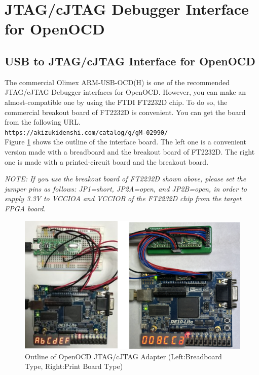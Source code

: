 \section{JTAG/cJTAG Debugger Interface for OpenOCD}

\subsection{USB to JTAG/cJTAG Interface for OpenOCD}

The commercial Olimex ARM-USB-OCD(H) is one of the recommended JTAG/cJTAG Debugger interfaces for OpenOCD. However, you can make an almost-compatible one by using the FTDI FT2232D chip. To do so, the commercial breakout board of FT2232D is convenient. You can get the board from the following URL.\\
\texttt{https://akizukidenshi.com/catalog/g/gM-02990/}\\
 Figure \ref{fig:USBJTAGOUTLINE} shows the outline of the interface board. The left one is a convenient version made with a breadboard and the breakout board of FT2232D. The right one is made with a printed-circuit board and the breakout board.

\textit{NOTE: If you use the breakout board of FT2232D shown above, please set the jumper pins as follows: JP1=short, JP2A=open, and JP2B=open, in order to supply 3.3V to VCCIOA and VCCIOB of the FT2232D chip from the target FPGA board.}

\begin{figure}[H]
    \includegraphics[width=1.0\columnwidth]{./Figure/USB_JTAG_Outline.png}
    \caption{Outline of OpenOCD JTAG/cJTAG Adapter (Left:Breadboard Type, Right:Print Board Type)}
    \label{fig:USBJTAGOUTLINE}
\end{figure}

